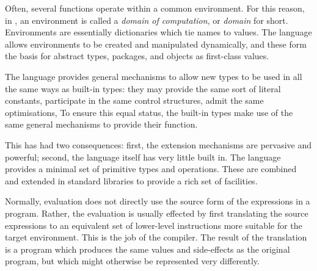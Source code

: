
Often, several functions operate within a common environment.  
For this reason, in \asharp{}, an environment is called a
{\em domain of computation}, or {\em domain} for short.  
Environments are essentially dictionaries which tie names to values.
The language allows environments to be created and manipulated dynamically,
and these form the basis for abstract types,
packages, and objects as first-class values.

The language provides general mechanisms to allow new types to 
be used in all the same ways as built-in types:
they may provide the same sort of literal constants, 
participate in the same control structures,
admit the same optimisations, \etc{}
To ensure this equal status, the built-in types make use of the
same general mechanisms to provide their function.

This has had two consequences:
first, the extension mechanisms are pervasive and powerful;
second, the language itself has very little built in.
The language provides a minimal set of primitive types
and operations.  
These are combined and extended in standard libraries to provide
a rich set of facilities.


Normally, evaluation does not directly use the source form of the
expressions in a program.  Rather, the evaluation is usually effected by
first translating the source expressions to an equivalent set of 
lower-level instructions more suitable for the target environment.
This is the job of the \asharp{} compiler.  The result of the translation
is a program which produces the same values and side-effects as the
original program, but which might otherwise be represented very differently.


